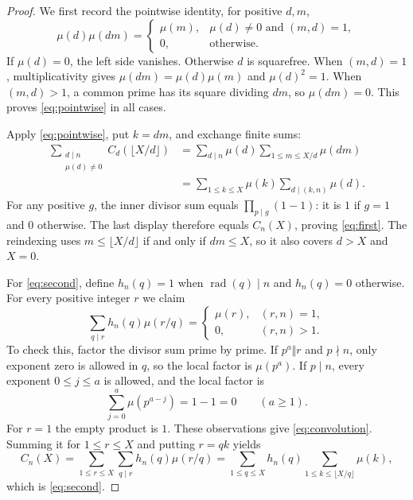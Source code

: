 \documentclass[11pt]{article}
\newcommand{\mob}{\mu}
\newcommand{\rad}{\operatorname{rad}}
\newcommand{\C}{C}
\begin{document}
\begin{proof}
We first record the pointwise identity, for positive $d,m$,
\begin{equation}\label{eq:pointwise}
 \mob(d)\mob(dm)=
 \begin{cases}
   \mob(m),&\mob(d)\ne0\text{ and }(m,d)=1,\\
   0,&\text{otherwise}.
 \end{cases}
\end{equation}
If $\mob(d)=0$, the left side vanishes. Otherwise $d$ is squarefree.
When $(m,d)=1$, multiplicativity gives
$\mob(dm)=\mob(d)\mob(m)$ and $\mob(d)^2=1$.
When $(m,d)>1$, a common prime has its square dividing $dm$, so
$\mob(dm)=0$. This proves \eqref{eq:pointwise} in all cases.

Apply \eqref{eq:pointwise}, put $k=dm$, and exchange finite sums:
\begin{align*}
 \sum_{\substack{d\mid n\\\mob(d)\ne0}}
       \C_d(\lfloor X/d\rfloor)
 &=\sum_{d\mid n}\mob(d)\sum_{1\leq m\leq X/d}\mob(dm)\\
 &=\sum_{1\leq k\leq X}\mob(k)
        \sum_{d\mid(k,n)}\mob(d).
\end{align*}
For any positive $g$, the inner divisor sum equals
$\prod_{p\mid g}(1-1)$: it is $1$ if $g=1$ and $0$ otherwise.
The last display therefore equals $\C_n(X)$, proving \eqref{eq:first}.
The reindexing uses $m\leq\lfloor X/d\rfloor$ if and only if $dm\leq X$,
so it also covers $d>X$ and $X=0$.

For \eqref{eq:second}, define $h_n(q)=1$ when $\rad(q)\mid n$ and
$h_n(q)=0$ otherwise. For every positive integer $r$ we claim
\begin{equation}\label{eq:convolution}
 \sum_{q\mid r}h_n(q)\mob(r/q)
   =\begin{cases}\mob(r),&(r,n)=1,\\0,&(r,n)>1.\end{cases}
\end{equation}
To check this, factor the divisor sum prime by prime. If $p^a\Vert r$
and $p\nmid n$, only exponent zero is allowed in $q$, so the local
factor is $\mob(p^a)$. If $p\mid n$, every exponent $0\leq j\leq a$
is allowed, and the local factor is
\[
 \sum_{j=0}^{a}\mob(p^{a-j})=1-1=0\qquad(a\geq1).
\]
For $r=1$ the empty product is $1$. These observations give
\eqref{eq:convolution}. Summing it for $1\leq r\leq X$ and putting
$r=qk$ yields
\[
 \C_n(X)=\sum_{1\leq r\leq X}\sum_{q\mid r}h_n(q)\mob(r/q)
 =\sum_{1\leq q\leq X}h_n(q)
       \sum_{1\leq k\leq\lfloor X/q\rfloor}\mob(k),
\]
which is \eqref{eq:second}.
\end{proof}
\end{document}
